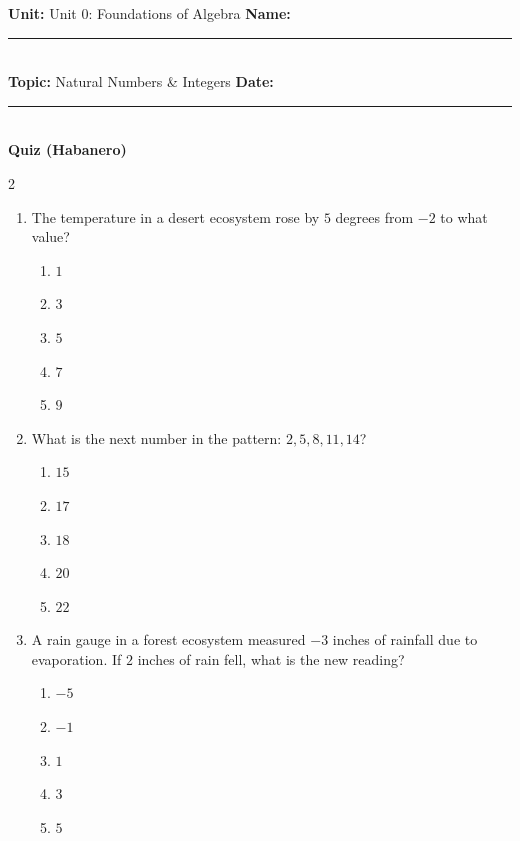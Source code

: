 \documentclass[10pt]{article}
\begin{document}
\enlargethispage{2.5cm}

\begin{tcolorbox}[colback=mainblue!5, colframe=mainblue, sharp corners, boxrule=0.5pt]
    \small \textbf{Unit:} Unit 0: Foundations of Algebra \hfill \textbf{Name:} \rule{3cm}{0.4pt} \\
    \small \textbf{Topic:} Natural Numbers & Integers \hfill \textbf{Date:} \rule{2cm}{0.4pt} \\
    \centering \textbf{\large Quiz (Habanero)}
\end{tcolorbox}

\vspace{0.2cm}

\begin{multicols}{2}
\begin{enumerate}[label=\textbf{Q\arabic*.}, leftmargin=*, itemsep=6pt, parsep=0pt]

  \item \small The temperature in a desert ecosystem rose by $5$ degrees from $-2$ to what value?
  \begin{enumerate}[label=(\Alph*), leftmargin=0.6cm, nosep, itemsep=2pt]
    \item $1$
    \item $3$
    \item $5$
    \item $7$
    \item $9$
  \end{enumerate}

  \item \small What is the next number in the pattern: $2, 5, 8, 11, 14$?
  \begin{enumerate}[label=(\Alph*), leftmargin=0.6cm, nosep, itemsep=2pt]
    \item $15$
    \item $17$
    \item $18$
    \item $20$
    \item $22$
  \end{enumerate}

  \item \small A rain gauge in a forest ecosystem measured $-3$ inches of rainfall due to evaporation. If $2$ inches of rain fell, what is the new reading?
  \begin{enumerate}[label=(\Alph*), leftmargin=0.6cm, nosep, itemsep=2pt]
    \item $-5$
    \item $-1$
    \item $1$
    \item $3$
    \item $5$
  \end{enumerate}


\end{enumerate}
\end{multicols}
\end{document}
